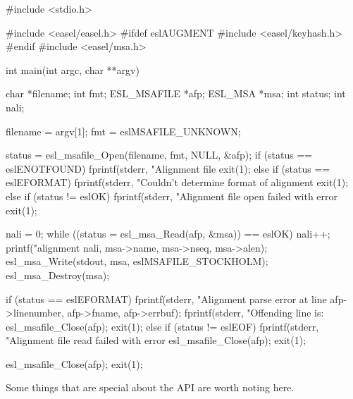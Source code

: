 \begin{cchunk}
#include <stdio.h>

#include <easel/easel.h>
#ifdef eslAUGMENT
#include <easel/keyhash.h>
#endif
#include <easel/msa.h>

int
main(int argc, char **argv)
{
  char        *filename;
  int          fmt;
  ESL_MSAFILE *afp;
  ESL_MSA     *msa;
  int          status;
  int          nali;

  filename = argv[1];
  fmt      = eslMSAFILE_UNKNOWN;

  status = esl_msafile_Open(filename, fmt, NULL, &afp);
  if (status == eslENOTFOUND) 
    {
      fprintf(stderr, "Alignment file %
      exit(1);
    } 
  else if (status == eslEFORMAT) 
    {
      fprintf(stderr, "Couldn't determine format of alignment %
      exit(1);
    } 
  else if (status != eslOK) 
    {
      fprintf(stderr, "Alignment file open failed with error %
      exit(1);
    }

  nali = 0;
  while ((status = esl_msa_Read(afp, &msa)) == eslOK)
    {
      nali++;
      printf("alignment %
	     nali, msa->name, msa->nseq, msa->alen);
      esl_msa_Write(stdout, msa, eslMSAFILE_STOCKHOLM);
      esl_msa_Destroy(msa);
    }

  if (status == eslEFORMAT) 
    {
      fprintf(stderr, "Alignment parse error at line %
	      afp->linenumber, afp->fname, afp->errbuf);
      fprintf(stderr, "Offending line is: %
      esl_msafile_Close(afp);
      exit(1);
    } 
  else if (status != eslEOF) 
    {
      fprintf(stderr, "Alignment file read failed with error %
      esl_msafile_Close(afp);
      exit(1);
    }

  esl_msafile_Close(afp);
  exit(1);
}
\end{cchunk}

Some things that are special about the API are worth noting here.

